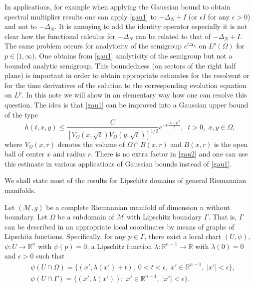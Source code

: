 \documentclass[10pt]{amsart}
\theoremstyle{definition}
\begin{document}
 \smallskip
 In  applications, for example when applying the Gaussian bound to obtain  spectral multiplier results one can apply  \eqref{gau1}
 to $-\Delta_N + I$ (or $\epsilon I$ for any $\epsilon > 0$) and not to $-\Delta_N$. It is annoying to add the identity operator especially it is not clear how the functional calculus for $-\Delta_N$ can be related to that of $-\Delta_N + I$. The same problem  occurs for analyticity of the semigroup $e^{t\Delta_N}$ on $L^p(\Omega)$ for $p \in [1, \infty)$. One obtains from \eqref{gau1} analyticity of the semigroup but not a bounded analytic semigroup.  This   boundedness (on sectors  of the right half plane)  is important in order to obtain appropriate estimates for the resolvent  or for the time derivatives of the  solution to the corresponding evolution equation on $L^p$. 
 In this note we will show in an elementary way how one can resolve this question. The 
 idea is  that \eqref{gau1} can be improved into a Gaussian upper bound of the type
 \begin{equation}\label{gau2}
h(t,x,y)\leq \frac{C}{\left[V_\Omega(x,\sqrt{t})V_\Omega (y,\sqrt{t})\right]^{1/2}}e^{-c \frac{|x-y|^2}{t}},\;\;  t>0,\; x,y\in \Omega,
\end{equation}
where $V_\Omega(x,r)$ denotes the volume of $\Omega \cap B(x, r)$ and  $B(x,r)$ is the open ball of center $x$ and radius $r$. There is no extra factor in \eqref{gau2} and one can use this estimate in various applications of Gaussian bounds  instead of \eqref{gau1}. 

\smallskip
We shall state most of the results for Lipschitz domains of general Riemannian manifolds. 

\smallskip
Let $(\mathcal{M}, g)$ be a complete Riemannian manifold of dimension $n$ without boundary. Let $\Omega$ be a subdomain of $\mathcal{M}$ with Lipschitz boundary $\Gamma$. That is, $\Gamma$ can be described in an appropriate local coordinates by means of graphs of Lipschitz functions. Specifically, for any $p\in \Gamma$, there exist a local chart $(U,\psi )$, $\psi:U\rightarrow \mathbb{R}^n$ with $\psi(p)=0$, a Lipschitz function $\lambda:\mathbb{R}^{n-1}\rightarrow \mathbb{R}$ with $\lambda (0)=0$ and $\epsilon >0$ such that
\begin{align*}
&\psi (U\cap \Omega )=\{(x',\lambda (x')+t);\; 0<t<\epsilon ,\; x'\in \mathbb{R}^{n-1},\; |x'|<\epsilon\},
\\
&\psi (U\cap \Gamma )=\{(x',\lambda (x'));\;  x'\in \mathbb{R}^{n-1},\; |x'|<\epsilon\}.
\end{align*}
\end{document}
